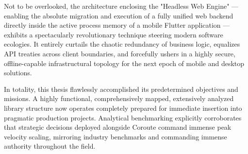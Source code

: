Not to be overlooked, the architecture enclosing the "Headless Web Engine" --- enabling the absolute migration and execution of a fully unified web backend directly inside the active process memory of a mobile Flutter application --- exhibits a spectacularly revolutionary technique steering modern software ecologies. It entirely curtails the chaotic redundancy of business logic, equalizes API treaties across client boundaries, and forcefully ushers in a highly secure, offline-capable infrastructural topology for the next epoch of mobile and desktop solutions.

In totality, this thesis flawlessly accomplished its predetermined objectives and missions. A highly functional, comprehensively mapped, extensively analyzed library structure now operates completely prepared for immediate insertion into pragmatic production projects. Analytical benchmarking explicitly corroborates that strategic decisions deployed alongside Coroute command immense peak velocity scaling, mirroring industry benchmarks and commanding immense authority throughout the field.
